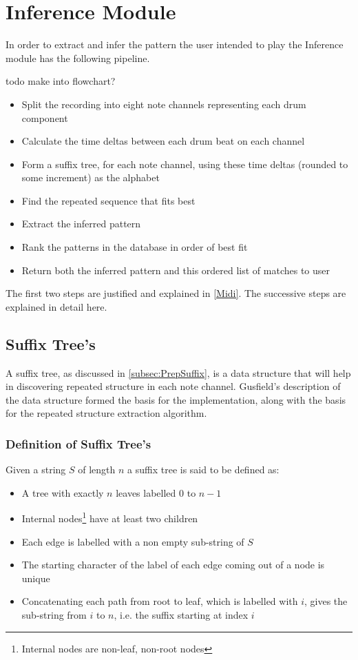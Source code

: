 \documentclass[12pt,twoside,notitlepage]{report}
\begin{document}
	\section{Inference Module}\label{sec:Inference Module}

	In order to extract and infer the pattern the user intended to play the Inference module has the following pipeline.

todo make into flowchart?
	\begin{itemize}
		\item{Split the recording into eight note channels representing each drum component}
		\item{Calculate the time deltas between each drum beat on each channel}
		\item{Form a suffix tree, for each note channel, using these time deltas (rounded to some increment) as the alphabet}
		\item{Find the repeated sequence that fits best}
		\item{Extract the inferred pattern}
		\item{Rank the patterns in the database in order of best fit}
		\item{Return both the inferred pattern and this ordered list of matches to user}
	\end{itemize}
	
	The first two steps are justified and explained in \ref{Midi}. The successive steps are explained in detail here. 
		\subsection{\label{subsec:SuffixTree}Suffix Tree's}
		A suffix tree, as discussed in \ref{subsec:PrepSuffix}, is a data structure that will help in discovering repeated structure in each note channel. Gusfield's\cite{Gusfield1999} description of the data structure formed the basis for the implementation, along with the basis for the repeated structure extraction algorithm.
		
			\subsubsection{Definition of Suffix Tree's}
			Given a string $S$ of length $n$ a suffix tree is said to be defined as:
			\begin{itemize}
				\item{A tree with exactly $n$ leaves labelled $0$ to $n-1$}
				\item{Internal nodes\footnote{Internal nodes are non-leaf, non-root nodes} have at least two children}
				\item{Each edge is labelled with a non empty sub-string of $S$}
				\item{The starting character of the label of each edge coming out of a node is unique}
				\item{Concatenating each path from root to leaf, which is labelled with $i$, gives the sub-string from $i$ to $n$, i.e. the suffix starting at index $i$}
\end{itemize}
			
\end{document}
